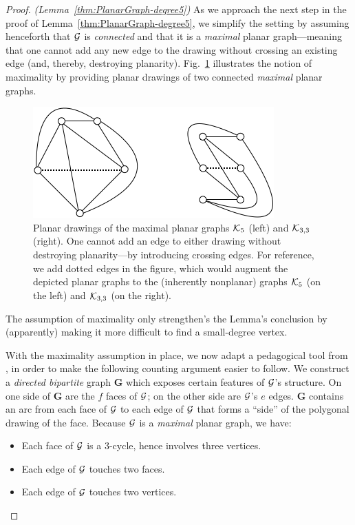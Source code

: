\begin{proof} {\em (Lemma~\ref{thm:PlanarGraph-degree5})}
As we approach the next step in the proof of Lemma~\ref{thm:PlanarGraph-degree5}, we  simplify the setting by assuming henceforth that $\mbox{$\cal G$}$ is {\em connected} and that it is a {\em maximal} planar graph---meaning that one cannot add any new edge to the drawing without crossing an existing edge (and, thereby, destroying planarity).  Fig.~\ref{fig:K5andK3by3} illustrates the notion of maximality by providing planar drawings of two connected {\em maximal} planar graphs.
\begin{figure}[hbt]
\begin{center}
       \includegraphics[scale=0.55]{FiguresGraph/K5andK3by3}
\caption{Planar drawings of the maximal planar graphs $\mbox{$\cal K$}_5$ (left) and $\mbox{$\cal K$}_{3,3}$ (right).  One cannot add an edge to either drawing without destroying planarity---by introducing crossing edges.  For reference, we add dotted edges in the figure, which would augment the depicted planar graphs to the (inherently nonplanar) graphs $\mbox{$\cal K$}_5$ (on the left) and $\mbox{$\cal K$}_{3,3}$ (on the right).}
  \label{fig:K5andK3by3}
\end{center}
\end{figure}
The assumption of maximality only strengthen's the Lemma's conclusion by (apparently) making it more difficult to find a small-degree vertex.

\smallskip

With the maximality assumption in place, we now adapt a pedagogical tool from \cite{Berge73}, in order to make the following counting argument easier to follow.  We construct a {\em directed bipartite} graph {\bf G} which exposes certain features of $\mbox{$\cal G$}$'s structure.  On one side of {\bf G} are the $f$ faces of $\mbox{$\cal G$}$; on the other side are $\mbox{$\cal G$}$'s $e$ edges.  {\bf G} contains an arc from each face of $\mbox{$\cal G$}$ to each edge of $\mbox{$\cal G$}$ that forms a ``side'' of the polygonal drawing of the face.  Because $\mbox{$\cal G$}$ is a {\em maximal} planar graph, we have:
\begin{itemize}
\item
Each face of $\mbox{$\cal G$}$ is a $3$-cycle, hence involves three vertices.
\medskip\item
Each edge of $\mbox{$\cal G$}$ touches two faces.
\medskip\item
Each edge of $\mbox{$\cal G$}$ touches two vertices.
\end{itemize}


\end{proof}
